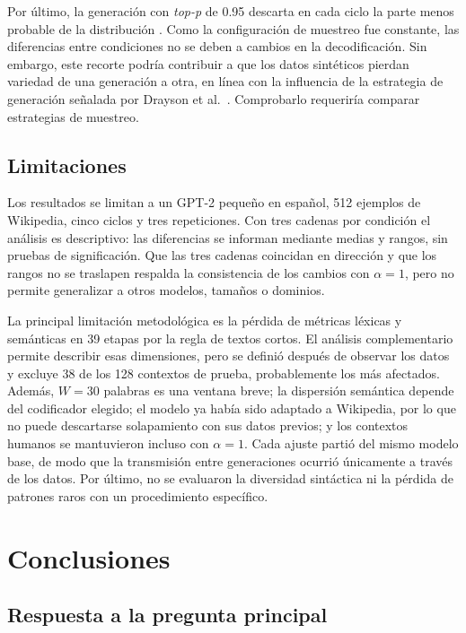 \documentclass[12pt,letterpaper]{article}
\begin{document}
Por último, la generación con \textit{top-p} de 0.95 descarta en cada ciclo
la parte menos probable de la distribución \cite{holtzman2020}. Como la
configuración de muestreo fue constante, las diferencias entre condiciones
no se deben a cambios en la decodificación. Sin embargo, este recorte
podría contribuir a que los datos sintéticos pierdan variedad de una
generación a otra, en línea con la influencia de la estrategia de
generación señalada por Drayson et al.\ \cite{drayson2025}. Comprobarlo
requeriría comparar estrategias de muestreo.

\subsection{Limitaciones}

Los resultados se limitan a un GPT-2 pequeño en español, 512 ejemplos de
Wikipedia, cinco ciclos y tres repeticiones. Con tres cadenas por condición
el análisis es descriptivo: las diferencias se informan mediante medias y
rangos, sin pruebas de significación. Que las tres cadenas coincidan en
dirección y que los rangos no se traslapen respalda la consistencia de los
cambios con \(\alpha=1\), pero no permite generalizar a otros modelos,
tamaños o dominios.

La principal limitación metodológica es la pérdida de métricas léxicas y
semánticas en 39 etapas por la regla de textos cortos. El análisis
complementario permite describir esas dimensiones, pero se definió después
de observar los datos y excluye 38 de los 128 contextos de prueba,
probablemente los más afectados. Además, \(W=30\) palabras es una ventana
breve; la dispersión semántica depende del codificador elegido; el modelo
ya había sido adaptado a Wikipedia, por lo que no puede descartarse
solapamiento con sus datos previos; y los contextos humanos se mantuvieron
incluso con \(\alpha=1\). Cada ajuste partió del mismo modelo base, de modo
que la transmisión entre generaciones ocurrió únicamente a través de los
datos. Por último, no se evaluaron la diversidad sintáctica ni la pérdida
de patrones raros con un procedimiento específico.

\section{Conclusiones}

\subsection{Respuesta a la pregunta principal}
\end{document}

